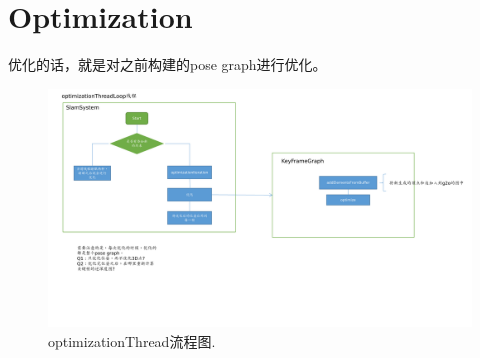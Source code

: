 \section{Optimization}

优化的话，就是对之前构建的pose graph进行优化。
\begin{figure}[h]%
	\centering  %
	\includegraphics[width=1.0\linewidth]{image/LSD-SLAM/LSD-SLAM-optimization.pdf}  %
	\caption{optimizationThread流程图.}  %
	\label{fig:optimization_thread}   %
\end{figure}